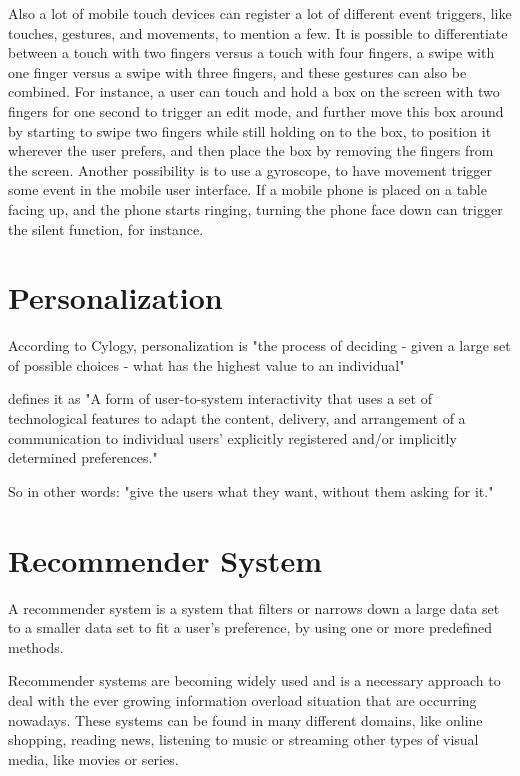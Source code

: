 Also a lot of mobile touch devices can register a lot of different event triggers, like touches, gestures, and movements, to mention a few. It is possible to differentiate between a touch with two fingers versus a touch with four fingers, a swipe with one finger versus a swipe with three fingers, and these gestures can also be combined. For instance, a user can touch and hold a box on the screen with two fingers for one second to trigger an edit mode, and further move this box around by starting to swipe two fingers while still holding on to the box, to position it wherever the user prefers, and then place the box by removing the fingers from the screen. Another possibility is to use a gyroscope, to have movement trigger some event in the mobile user interface. If a mobile phone is placed on a table facing up, and the phone starts ringing, turning the phone face down can trigger the silent function, for instance.


\section{Personalization}

According to Cylogy, personalization is "the process of deciding - given a large set of possible choices - what has the highest value to an individual"\cite{personalization_overview}

\cite{thurman2012future} defines it as "A form of user-to-system interactivity that uses a set of technological features to adapt the content, delivery, and arrangement of a communication to individual users’ explicitly registered and/or implicitly determined preferences."

So in other words: "give the users what they want, without them asking for it."

\section{Recommender System}
\label{theoretical_overview_recommender_system}
A recommender system is a system that filters or narrows down a large data set to a smaller data set to fit a user's preference, by using one or more predefined methods.

Recommender systems are becoming widely used and is a necessary approach to deal with the ever growing information overload situation that are occurring nowadays. These systems can be found in many different domains, like online shopping, reading news, listening to music or streaming other types of visual media, like movies or series.

